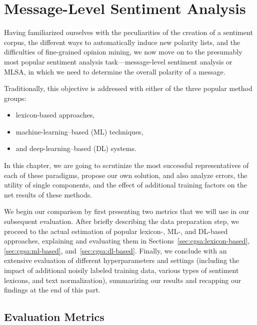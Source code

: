 \chapter{Message-Level Sentiment Analysis}\label{chap:cgsa}

Having familiarized ourselves with the peculiarities of the creation
of a sentiment corpus, the different ways to automatically induce new
polarity lists, and the difficulties of fine-grained opinion mining,
we now move on to the presumably most popular sentiment analysis
task---message-level sentiment analysis or MLSA, in which we need to
determine the overall polarity of a message.

Traditionally, this objective is addressed with either of the three
popular method groups:
\begin{itemize}
  \item lexicon-based approaches,
  \item machine-learning--based (ML) techniques,
  \item and deep-learning--based (DL) systems.
\end{itemize}
In this chapter, we are going to scrutinize the most successful
representatives of each of these paradigms, propose our own solution,
and also analyze errors, the utility of single components, and the
effect of additional training factors on the net results of these
methods.


We begin our comparison by first presenting two metrics that we will
use in our subsequent evaluation.  After briefly describing the data
preparation step, we proceed to the actual estimation of popular
lexicon-, ML-, and DL-based approaches, explaining and evaluating them
in Sections~\ref{sec:cgsa:lexicon-based}, \ref{sec:cgsa:ml-based},
and~\ref{sec:cgsa:dl-based}.  Finally, we conclude with an extensive
evaluation of different hyperparameters and settings (including the
impact of additional noisily labeled training data, various types of
sentiment lexicons, and text normalization), summarizing our results
and recapping our findings at the end of this part.

\section{Evaluation Metrics}\label{sec:cgsa:eval-metrics}

